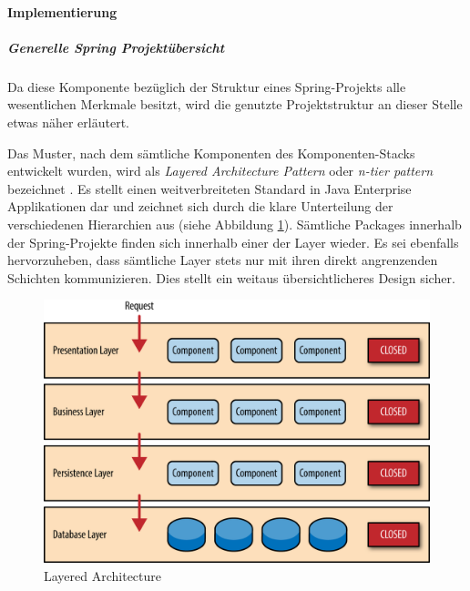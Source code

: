 \paragraph{Implementierung}

\subparagraph{Generelle Spring Projektübersicht}
Da diese Komponente bezüglich der Struktur eines Spring-Projekts alle wesentlichen Merkmale besitzt, wird die genutzte Projektstruktur an dieser Stelle etwas näher erläutert. 


Das Muster, nach dem sämtliche Komponenten des Komponenten-Stacks entwickelt wurden, wird als \emph{Layered Architecture Pattern} oder \emph{n-tier pattern} bezeichnet \cite{oreilly-layered-arch}. Es stellt einen weitverbreiteten Standard in Java Enterprise Applikationen dar und zeichnet sich durch die klare Unterteilung der verschiedenen Hierarchien aus (siehe Abbildung \ref{fig:layeredArchitecture}). Sämtliche Packages innerhalb der Spring-Projekte finden sich innerhalb einer der Layer wieder. Es sei ebenfalls hervorzuheben, dass sämtliche Layer stets nur mit ihren direkt angrenzenden Schichten kommunizieren. Dies stellt ein weitaus übersichtlicheres Design sicher.

\begin{figure}[ht!]
	\centering
	\includegraphics[width=.7\linewidth]{kapitel/problemloesung/implementierung/_img/dataflow-overview-01}
	\caption[Layered Architecture]{Layered Architecture \cite{oreilly-layered-arch}}
	\label{fig:layeredArchitecture}
\end{figure}


